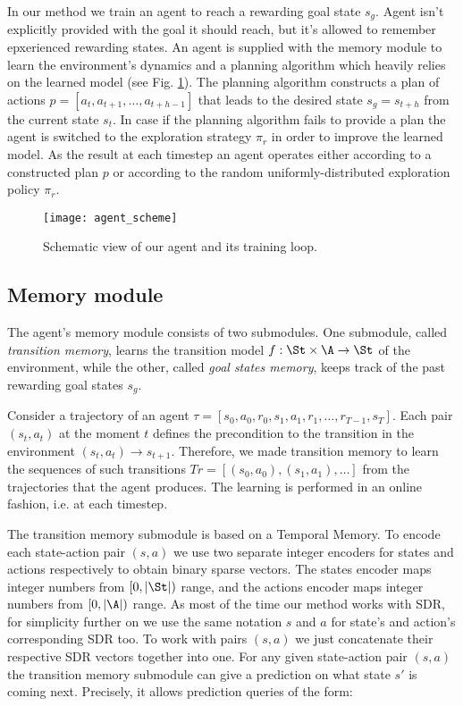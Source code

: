 \documentclass[a4paper,twoside]{article}
\begin{document}
In our method we train an agent to reach a rewarding goal state $s_g$. Agent isn't explicitly provided with the goal it should reach, but it's allowed to remember epxerienced rewarding states. An agent is supplied with the memory module to learn the environment's dynamics and a planning algorithm which heavily relies on the learned model (see Fig. \ref{fig_agent_scheme}). The planning algorithm constructs a plan of actions $p = [a_t, a_{t+1}, \dots, a_{t+h-1}]$ that leads to the desired state $s_g = s_{t+h}$ from the current state $s_t$. In case if the planning algorithm fails to provide a plan the agent is switched to the exploration strategy $\pi_r$ in order to improve the learned model. As the result at each timestep an agent operates either according to a constructed plan $p$ or according to the random uniformly-distributed exploration policy $\pi_r$.

\begin{figure}
  \centering
  \texttt{[image: agent\_scheme]}
  \caption{Schematic view of our agent and its training loop.} \label{fig_agent_scheme}
\end{figure}

\subsection{Memory module} \label{sec_MemoryModule}

The agent's memory module consists of two submodules. One submodule, called \textit{transition memory}, learns the transition model $f: \St \times \A \rightarrow \St$ of the environment, while the other, called \textit{goal states memory}, keeps track of the past rewarding goal states $s_g$.

Consider a trajectory of an agent $\tau = [s_0, a_0, r_0, s_1, a_1, r_1, \dots, r_{T-1}, s_T]$. Each pair $(s_t, a_t)$ at the moment $t$ defines the precondition to the transition in the environment $(s_t, a_t) \rightarrow s_{t+1}$. Therefore, we made transition memory to learn the sequences of such transitions $Tr = [(s_0, a_0), (s_1, a_1), \dots]$ from the trajectories that the agent produces. The learning is performed in an online fashion, i.e. at each timestep.

The transition memory submodule is based on a Temporal Memory. To encode each state-action pair $(s, a)$ we use two separate integer encoders for states and actions respectively to obtain binary sparse vectors. The states encoder maps integer numbers from $[0, |\St|)$ range, and the actions encoder maps integer numbers from $[0, |\A|)$ range. As most of the time our method works with SDR, for simplicity further on we use the same notation $s$ and $a$ for state's and action's corresponding SDR too. To work with pairs $(s, a)$ we just concatenate their respective SDR vectors together into one. For any given state-action pair $(s, a)$ the transition memory submodule can give a prediction on what state $s'$ is coming next. Precisely, it allows prediction queries of the form:
\end{document}
